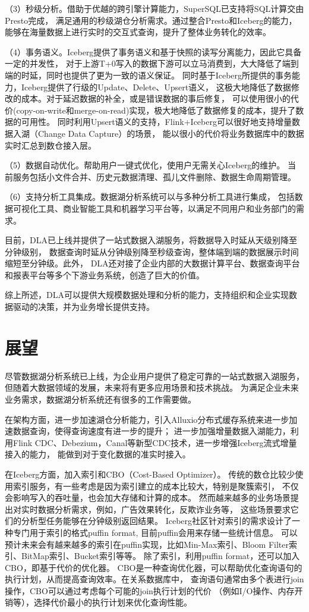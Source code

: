 （3）秒级分析。借助于优越的跨引擎计算能力，SuperSQL已支持将SQL计算交由Presto完成，
满足通用的秒级湖仓分析需求。通过整合Presto和Iceberg的能力，能够在海量数据上进行实时的交互式查询，提升了整体业务转化的效率。

（4）事务语义。Iceberg提供了事务语义和基于快照的读写分离能力，因此它具备一定的并发性，
对于上游T+0写入的数据下游可以立马消费到，大大降低了端到端的时延，同时也提供了更为一致的语义保证。
同时基于Iceberg所提供的事务能力，Iceberg提供了行级的Update、Delete、Upsert语义，
这极大地降低了数据修改的成本。对于延迟数据的补全，或是错误数据的事后修复，
可以使用很小的代价(copy-on-write和merge-on-read)实现，极大地降低了数据修复的成本，提升了数据的可用性。
同时利用Upsert语义的支持，Flink+Iceberg可以很好地支持增量数据入湖（Change Data Capture）的场景，
能以很小的代价将业务数据库中的数据实时汇总到数仓接入层。

（5）数据自动优化。帮助用户一键式优化，使用户无需关心Iceberg的维护。
当前服务包括小文件合并、历史元数据清理、孤儿文件删除、数据生命周期管理。

（6）支持分析工具集成。数据湖分析系统可以与多种分析工具进行集成，
包括数据可视化工具、商业智能工具和机器学习平台等，以满足不同用户和业务部门的需求。

目前，DLA已上线并提供了一站式数据入湖服务，将数据导入时延从天级别降至分钟级别，
数据查询时延从分钟级别降至秒级查询，整体端到端的数据展示时间缩短至分钟级。此外，
DLA还对接了企业内部的大数据计算平台、数据查询平台和报表平台等多个下游业务系统，创造了巨大的价值。

综上所述，DLA可以提供大规模数据处理和分析的能力，支持组织和企业实现数据驱动的决策，并为业务增长提供支持。

\section{展望}

尽管数据湖分析系统已上线，为企业用户提供了稳定可靠的一站式数据入湖服务，
但随着大数据领域的发展，未来将有更多应用场景和技术挑战。
为满足企业未来业务需求，数据湖分析系统还有很多的工作需要做。

在架构方面，进一步加速湖仓分析能力，引入Alluxio分布式缓存系统来进一步加速数据查询，使得查询速度有进一步的提升；
进一步加强增量数据入湖能力，利用Flink CDC、Debezium，Canal等新型CDC技术，进一步增强Iceberg流式增量接入的能力，
能做到对于变化数据的准实时接入。

在Iceberg方面，加入索引和CBO（Cost-Based Optimizer）。
传统的数仓比较少使用索引服务，有一些考虑是因为索引建立的成本比较大，特别是聚簇索引，
不仅会影响写入的吞吐量，也会加大存储和计算的成本。
然而越来越多的业务场景提出对实时数据分析需求，例如，广告效果转化，反欺诈业务等，
这些场景要求它们的分析型任务能够在分钟级别返回结果。
Iceberg社区针对索引的需求设计了一种专门用于索引的格式puffin format, 目前puffin会用来存储一些统计信息。
可以预计未来会有越来越多的索引在puffin实现，比如Min-Max索引、Bloom Filter索引、BitMap索引、Bucket索引等等。
除了索引，利用puffin format，还可以加入CBO，即基于代价的优化器。
CBO是一种查询优化器，可以帮助优化查询语句的执行计划，从而提高查询效率。在关系数据库中，
查询语句通常由多个表进行join操作，CBO可以通过考虑每个可能的join执行计划的代价
（例如I/O操作、内存开销等），选择代价最小的执行计划来优化查询性能。

